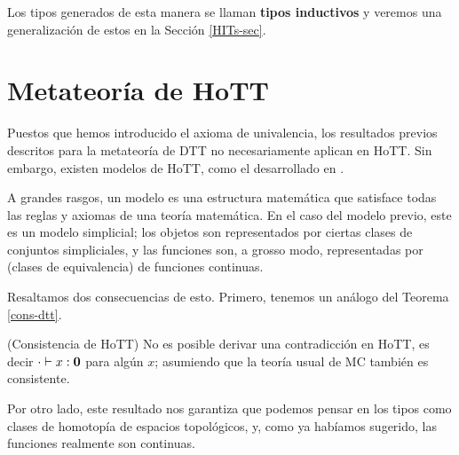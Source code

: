 \documentclass[../main.tex]{subfiles}
\begin{document}
Los tipos generados de esta manera se llaman \textbf{tipos inductivos} y veremos una generalizaci\'on de estos en la Secci\'on \ref{HITs-sec}.

\section{Metateor\'ia de HoTT}
Puestos que hemos introducido el axioma de univalencia, los resultados previos descritos para la metateor\'ia de DTT no necesariamente aplican en HoTT.
Sin embargo, existen modelos de HoTT, como el desarrollado en \cite{kapulkin_simplicial_2021}.

A grandes rasgos, un modelo es una estructura matem\'atica que satisface todas las reglas y axiomas de una teor\'ia matem\'atica.
En el caso del modelo previo, este es un modelo simplicial; los objetos son representados por ciertas clases de conjuntos simpliciales, y las funciones son, a grosso modo, representadas por (clases de equivalencia) de funciones continuas.

Resaltamos dos consecuencias de esto. Primero, tenemos un an\'alogo del Teorema \ref{cons-dtt}.

\begin{theorem}(Consistencia de HoTT)
  No es posible derivar una contradicción en HoTT, es decir $\cdot \vdash x : \mathbf{0}$ para alg\'un $x$; asumiendo que la teor\'ia usual de MC tambi\'en es consistente.
\end{theorem}

Por otro lado, este resultado nos garantiza que podemos pensar en los tipos como clases de homotop\'ia de espacios topol\'ogicos, y, como ya hab\'iamos sugerido, las funciones realmente son continuas.
\end{document}
